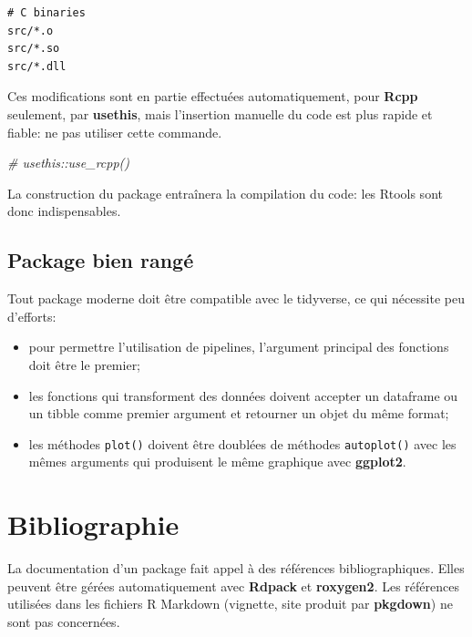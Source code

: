 \documentclass[
  11pt,
  french,
  a4paper,
  extrafontsizes,onecolumn,openright
  ]{memoir}
\newenvironment{Shaded}{\begin{snugshade}}{\end{snugshade}}
\newcommand{\CommentTok}[1]{\textcolor[rgb]{0.56,0.35,0.01}{\textit{#1}}}
\providecommand{\tightlist}{%
  \setlength{\itemsep}{0pt}\setlength{\parskip}{0pt}}
\begin{document}
\begin{verbatim}
# C binaries
src/*.o
src/*.so
src/*.dll
\end{verbatim}

Ces modifications sont en partie effectuées automatiquement, pour \textbf{Rcpp} seulement, par \textbf{usethis}, mais l'insertion manuelle du code est plus rapide et fiable: ne pas utiliser cette commande.

\scriptsize

\begin{Shaded}
\begin{Highlighting}[]
\CommentTok{\# usethis::use\_rcpp()}
\end{Highlighting}
\end{Shaded}

\normalsize

La construction du package entraînera la compilation du code: les Rtools sont donc indispensables.

\hypertarget{package-bien-ranguxe9}{%
\subsection{Package bien rangé}\label{package-bien-ranguxe9}}

Tout package moderne doit être compatible avec le tidyverse, ce qui nécessite peu d'efforts:

\begin{itemize}
\tightlist
\item
  pour permettre l'utilisation de pipelines, l'argument principal des fonctions doit être le premier;
\item
  les fonctions qui transforment des données doivent accepter un dataframe ou un tibble comme premier argument et retourner un objet du même format;
\item
  les méthodes \texttt{plot()} doivent être doublées de méthodes \texttt{autoplot()} avec les mêmes arguments qui produisent le même graphique avec \textbf{ggplot2}.
\end{itemize}

\hypertarget{bibliographie}{%
\section{Bibliographie}\label{bibliographie}}

La documentation d'un package fait appel à des références bibliographiques.
Elles peuvent être gérées automatiquement avec \textbf{Rdpack} et \textbf{roxygen2}.
Les références utilisées dans les fichiers R Markdown (vignette, site produit par \textbf{pkgdown}) ne sont pas concernées.
\end{document}
